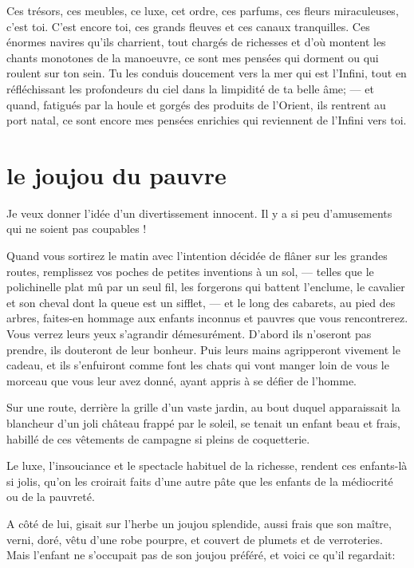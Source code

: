 Ces trésors, ces meubles, ce luxe, cet ordre, ces parfums, ces fleurs
miraculeuses, c’est toi. C’est encore
toi, ces grands fleuves et ces canaux tranquilles. Ces énormes navires
qu’ils charrient, tout chargés de richesses et
d’où montent les chants monotones de la manoeuvre, ce
sont mes pensées qui dorment ou qui roulent sur ton sein. Tu les
conduis doucement vers la mer qui est l’Infini, tout
en réfléchissant les profondeurs du ciel dans la limpidité de ta belle
âme; --- et quand, fatigués par la houle et gorgés des produits de
l’Orient, ils rentrent au port natal, ce sont encore
mes pensées enrichies qui reviennent de l’Infini vers
toi.

\quebra\section[Le joujou du pauvre]{le joujou du pauvre }

Je veux donner l’idée d’un
divertissement innocent. Il y a si peu d’amusements
qui ne soient pas coupables !

Quand vous sortirez le matin avec l’intention décidée
de flâner sur les grandes routes, remplissez vos poches de petites
inventions à un sol, --- telles que le polichinelle plat mû par un seul
fil, les forgerons qui battent l’enclume, le cavalier
et son cheval dont la queue est un sifflet, --- et le long des cabarets,
au pied des arbres, faites{}-en hommage aux enfants inconnus et pauvres
que vous rencontrerez. Vous verrez leurs yeux
s’agrandir démesurément. D’abord ils
n’oseront pas prendre, ils douteront de leur bonheur.
Puis leurs mains agripperont vivement le cadeau, et ils
s’enfuiront comme font les chats qui vont manger loin
de vous le morceau que vous leur avez donné, ayant appris à se défier
de l’homme.

Sur une route, derrière la grille d’un vaste jardin, au
bout duquel apparaissait la blancheur d’un joli
château frappé par le soleil, se tenait un enfant beau et frais,
habillé de ces vêtements de campagne si pleins de coquetterie.

Le luxe, l’insouciance et le spectacle habituel de la
richesse, rendent ces enfants{}-là si jolis, qu’on les
croirait faits d’une autre pâte que les enfants de la
médiocrité ou de la pauvreté.

A côté de lui, gisait sur l’herbe un joujou splendide,
aussi frais que son maître, verni, doré, vêtu d’une
robe pourpre, et couvert de plumets et de verroteries. Mais
l’enfant ne s’occupait pas de son
joujou préféré, et voici ce qu’il regardait:

